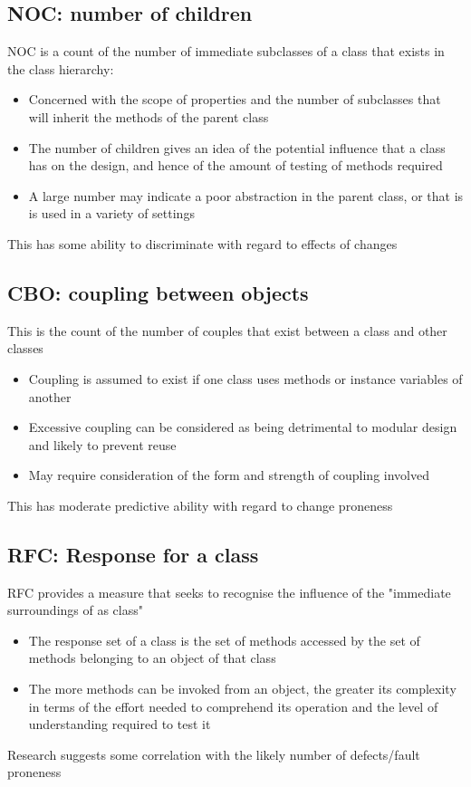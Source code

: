 \documentclass{article}[18pt]
\begin{document}
\subsection{NOC: number of children}
NOC is a count of the number of immediate subclasses of a class that exists in the class hierarchy:
\begin{itemize}
	\item Concerned with the scope of properties and the number of subclasses that will inherit the methods of the parent class
	\item The number of children gives an idea of the potential influence that a class has on the design, and hence of the amount of testing of methods required
	\item A large number may indicate a poor abstraction in the parent class, or that is is used in a variety of settings
\end{itemize}
This has some ability to discriminate with regard to effects of changes
\subsection{CBO: coupling between objects}
This is the count of the number of couples that exist between a class and other classes
\begin{itemize}
	\item Coupling is assumed to exist if one class uses methods or instance variables of another
	\item Excessive coupling can be considered as being detrimental to modular design and likely to prevent reuse
	\item May require consideration of the form and strength of coupling involved
\end{itemize}
This has moderate predictive ability with regard to change proneness
\subsection{RFC: Response for a class}
RFC provides a measure that seeks to recognise the influence of the "immediate surroundings of as class"
\begin{itemize}
	\item The response set of a class is the set of methods accessed by the set of methods belonging to an object of that class
	\item The more methods can be invoked from an object, the greater its complexity in terms of the effort needed to comprehend its operation and the level of understanding required to test it
\end{itemize}
Research suggests some correlation with the likely number of defects/fault proneness
\end{document}

